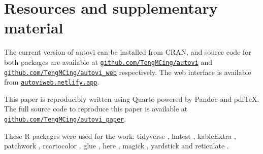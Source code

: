 \documentclass[
doublespace,
  times]{anzsauth}
\begin{document}
\section{Resources and supplementary
material}\label{resources-and-supplementary-material}

The current version of \textsf{autovi} can be installed from CRAN, and
source code for both packages are available at
\href{https://github.com/TengMCing/autovi}{\texttt{github.com/TengMCing/autovi}}
and
\href{https://github.com/TengMCing/autovi_web}{\texttt{github.com/TengMCing/autovi\_web}}
respectively. The web interface is available from
\href{https://autoviweb.netlify.app/}{\texttt{autoviweb.netlify.app}}.

This paper is reproducibly written using \textsf{Quarto}
\citep{Allaire_Quarto_2024} powered by \textsf{Pandoc}
\citep{MacFarlane_Pandoc} and \textsf{pdfTeX}. The full source code to
reproduce this paper is available at
\href{https://github.com/TengMCing/autovi_paper}{\texttt{github.com/TengMCing/autovi\_paper}}.

These \textsf{R} packages were used for the work: \textsf{tidyverse}
\citep{tidyverse}, \textsf{lmtest} \citep{lmtest}, \textsf{kableExtra}
\citep{kableextra}, \textsf{patchwork} \citep{patchwork},
\textsf{rcartocolor} \citep{rcartocolor}, \textsf{glue} \citep{glue},
\textsf{here} \citep{here}, \textsf{magick} \citep{magick},
\textsf{yardstick} \citep{yardstick} and \textsf{reticulate}
\citep{reticulate}.


  
\end{document}
